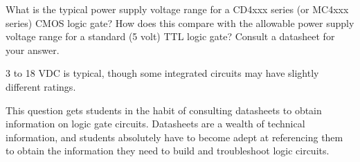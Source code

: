 

What is the typical power supply voltage range for a CD4xxx series (or MC4xxx series) CMOS logic gate?  How does this compare with the allowable power supply voltage range for a standard (5 volt) TTL logic gate?  Consult a datasheet for your answer.







3 to 18 VDC is typical, though some integrated circuits may have slightly different ratings.







This question gets students in the habit of consulting datasheets to obtain information on logic gate circuits.  Datasheets are a wealth of technical information, and students absolutely have to become adept at referencing them to obtain the information they need to build and troubleshoot logic circuits.




